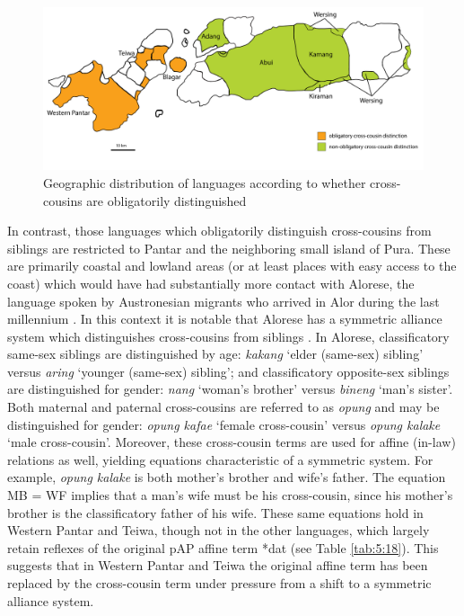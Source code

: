 \begin{figure}
\includegraphics[width=\textwidth]{figures/Holton_ch5_fig15.pdf}
\caption{Geographic distribution of languages according to whether  cross-cousins are obligatorily distinguished}
\label{fig_cross-cousin_map}
\end{figure}  
 

In contrast, those languages which obligatorily distinguish cross-cousins from siblings are restricted to Pantar and the neighboring small island of Pura. These are primarily coastal and lowland areas (or at least places with easy access to the coast) which would have had substantially more contact with Alorese, the language spoken by Austronesian migrants who arrived in Alor during the last millennium \citep{Klamer2011}. In this context it is notable that Alorese has a symmetric alliance system which distinguishes cross-cousins from siblings \citep{Needham1956,Barnes1973}. In Alorese, classificatory same-sex siblings are distinguished by age: \textit{kakang} `elder (same-sex) sibling' versus \textit{aring} `younger (same-sex) sibling'; and classificatory opposite-sex siblings are distinguished for gender: \textit{nang} `woman's brother' versus \textit{bineng} `man's sister'. Both maternal and paternal cross-cousins are referred to as \textit{opung} and may be distinguished for gender: \textit{opung kafae} `female cross-cousin' versus \textit{opung kalake} `male cross-cousin'. Moreover, these cross-cousin terms are used for affine (in-law) relations as well, yielding equations characteristic of a symmetric system. For example, \textit{opung kalake} is both mother's brother and wife's father. The equation MB = WF implies that a man's wife must be his cross-cousin, since his mother's brother is the classificatory father of his wife. These same equations hold in Western Pantar and Teiwa, though not in the other languages, which largely retain reflexes of the original pAP affine term *dat (see Table \ref{tab:5:18}). This suggests that in Western Pantar and Teiwa the original affine term has been replaced by the cross-cousin term under pressure from a shift to a symmetric alliance system. 

